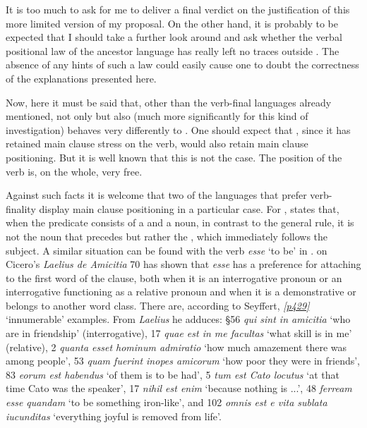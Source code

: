 It is too much to ask for me to deliver a final verdict on the justification of this more limited version of my proposal. On the other hand, it is probably to be expected that I should take a further look around and ask whether the verbal positional law of the ancestor language has really left no traces outside . The absence of any hints of such a law could easily cause one to doubt the correctness of the explanations presented here.

Now, here it must be said that, other than the verb-final languages already mentioned, not only  but also (much more significantly for this kind of investigation)  behaves very differently to . One should expect that , since it has retained main clause stress on the verb, would also retain main clause positioning. But it is well known that this is not the case. The position of the verb is, on the whole, very free.

Against such facts it is welcome that two of the languages that prefer verb-finality display  main clause positioning in a particular case. For , \citet[§1637]{Kurschat1876} states that, when the predicate consists of a  and a noun, in contrast to the general rule, it is not the noun that precedes but rather the , which immediately follows the subject. A similar situation can be found with the verb \emph{esse} `to be' in . \citet[441]{SeyffertMueller1876} on Cicero's \textit{Laelius de Amicitia} 70 has shown that \emph{esse} has a preference for attaching to the first word of the clause, both when it is an interrogative pronoun or an interrogative functioning as a relative pronoun and when it is a demonstrative or belongs to another word class. There are, according to Seyffert, \hyperlink{p429}{\emph{[p429]}} `innumerable' examples. From \textit{Laelius} he adduces: §56 \emph{qui \emph{sint} in amicitia} `who are in friendship' (interrogative), 17 \emph{quae \emph{est} in me facultas} `what skill is in me' (relative), 2 \emph{quanta \emph{esset} hominum admiratio} `how much amazement there was among people', 53 \emph{quam \emph{fuerint} inopes amicorum} `how poor they were in friends', 83 \emph{eorum \emph{est} habendus} `of them is to be had', 5 \emph{tum \emph{est} Cato locutus} `at that time Cato was the speaker', 17 \emph{nihil \emph{est} enim} `because nothing is ...', 48 \emph{ferream \emph{esse} quandam} `to be something iron-like', and 102 \emph{omnis \emph{est} e vita sublata iucunditas} `everything joyful is removed from life'.

